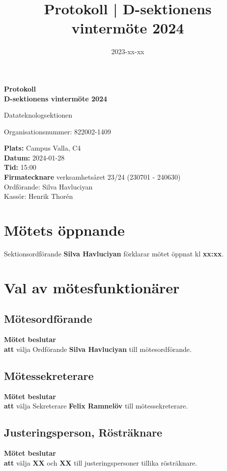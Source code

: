 \documentclass{datateknologsektionen-document}
\title{Protokoll | D-sektionens vintermöte 2024}
\date{2023-xx-xx}
\newcommand{\ind}{\hspace*{2em}}
\newcommand{\motetbeslutar}{\textbf{Mötet beslutar}}
\newcommand{\att}{\\\ind\textbf{att}}
\begin{document}
\hspace{0pt}
\vfill
\begin{center}
	\Huge\textbf{Protokoll \\ D-sektionens vintermöte 2024}

	\huge Datateknologsektionen

	\large
	Organisationsnummer: 822002-1409

\end{center}
\vfill
{\large
	\textbf{Plats:} Campus Valla, C4 \\
	\textbf{Datum:} 2024-01-28 \\
	\textbf{Tid:} 15:00 \\
	\textbf{Firmatecknare} verksamhetsåret 23/24 (230701 - 240630) \\
	\ind Ordförande: Silva Havluciyan \\
	\ind Kassör: Henrik Thorén
}
\vfill
\hspace{0pt}
\pagebreak




\tableofcontents
\pagebreak





\section{Mötets öppnande}
Sektionsordförande \textbf{Silva Havluciyan} förklarar mötet öppnat kl \textbf{xx:xx}.




\section{Val av mötesfunktionärer}
\subsection{Mötesordförande}
\motetbeslutar\att{} välja Ordförande \textbf{Silva Havluciyan} till mötesordförande.

\subsection{Mötessekreterare}
\motetbeslutar\att{} välja Sekreterare \textbf{Felix Ramnelöv} till mötessekreterare.

\subsection{Justeringsperson, Rösträknare}
\motetbeslutar\att{} välja \textbf{XX} och \textbf{XX} till justeringspersoner tillika rösträknare.
\end{document}
